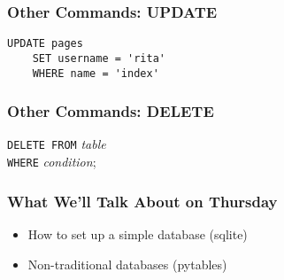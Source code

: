 \begin{frame}[fragile]
\frametitle{Other Commands: UPDATE}

\begin{verbatim}
UPDATE pages
    SET username = 'rita'
    WHERE name = 'index'
\end{verbatim}

\end{frame}

\begin{frame}[fragile]
\frametitle{Other Commands: DELETE}

\texttt{DELETE FROM} \textit{table}\\
\texttt{WHERE} \textit{condition};

\end{frame}

\begin{frame}[fragile]
\frametitle{What We'll Talk About on Thursday}

\begin{itemize}
\item How to set up a simple database (sqlite)
\item Non-traditional databases (pytables)
\end{itemize}
\end{frame}


